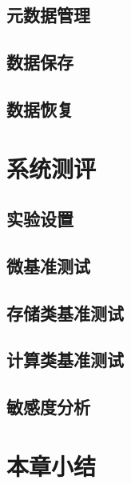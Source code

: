 \subsection{元数据管理}

\subsection{数据保存}

\subsection{数据恢复}

\section{系统测评}

\subsection{实验设置}

\subsection{微基准测试}

\subsection{存储类基准测试}

\subsection{计算类基准测试}

\subsection{敏感度分析}

\section{本章小结}

